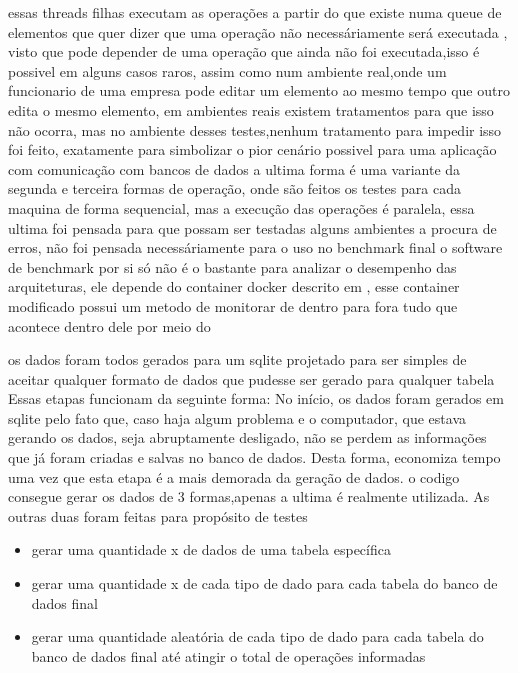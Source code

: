 \documentclass[
	12pt,				%
	openright,			%
	oneside,			%
	a4paper,			%
	english,			%
	french,				%
	spanish,			%
	brazil,				%
	]{abntex2}
\begin{document}
essas threads filhas executam as operações a partir do que existe numa queue de elementos que quer dizer que uma operação não necessáriamente será executada ,
visto que pode depender de uma operação que ainda não foi executada,isso é possivel em alguns casos raros,
assim como num ambiente real,onde um funcionario de uma empresa pode editar um elemento ao mesmo tempo que outro edita o mesmo elemento,
em ambientes reais existem tratamentos para que isso não ocorra,
mas no ambiente desses testes,nenhum tratamento para impedir isso foi feito,
exatamente para simbolizar o pior cenário possivel para uma aplicação com comunicação com bancos de dados\newline
a ultima forma é uma variante da segunda e terceira formas de operação,
onde são feitos os testes para cada maquina de forma sequencial, mas a execução das operações é paralela,
essa ultima foi pensada para que possam ser testadas alguns ambientes a procura de erros,
não foi pensada necessáriamente para o uso no benchmark final\newline
o software de benchmark por si só não é o bastante para analizar o desempenho das arquiteturas,
ele depende do container docker descrito em ,
esse container modificado possui um metodo de monitorar de dentro para fora tudo que acontece dentro dele por meio do  \newline


os dados foram todos gerados para um sqlite projetado para ser simples de aceitar qualquer formato de dados que pudesse ser gerado para qualquer tabela
Essas etapas funcionam da seguinte forma:\newline
No início, os dados foram gerados em sqlite pelo fato que, caso haja algum problema e o computador, que estava gerando os dados, seja abruptamente desligado,
não se perdem as informações que já foram criadas e salvas no banco de dados. Desta forma, economiza tempo uma vez que esta etapa é a mais demorada da geração de dados.\newline
o codigo consegue gerar os dados de 3 formas,apenas a ultima é realmente utilizada.
As outras duas foram feitas para propósito de testes

\begin{itemize}
\item gerar uma quantidade x de dados de uma tabela específica
\item gerar uma quantidade x de cada tipo de dado para cada tabela do banco de dados final
\item gerar uma quantidade aleatória de cada tipo de dado para cada tabela do banco de dados final até atingir o total de operações informadas
\end{itemize}
\end{document}
